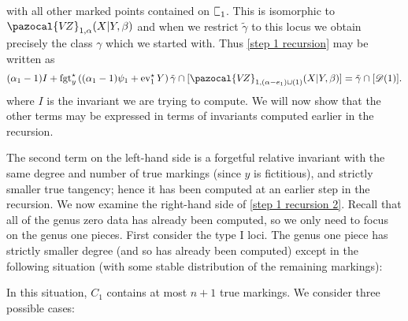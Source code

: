 \documentclass[11pt]{amsart}
\newcommand{\sqC}{\scalebox{0.8}[1.3]{$\sqsubset$}}
\newcommand{\VZ}{\pazocal{V\!Z}}
\newcommand{\st}{\star}
\newcommand{\ev}{\operatorname{ev}}
\newcommand{\fgt}{\operatorname{fgt}}
\newcommand{\Dcal}{\mathcal{D}}
\theoremstyle{definition}
\theoremstyle{definition}
\begin{document}
with all other marked points contained on $\sqC_1$. This is isomorphic to $\VZ_{1,\alpha}(X|Y,\beta)$ and when we restrict $\tilde\gamma$ to this locus we obtain precisely the class $\gamma$ which we started with. Thus \eqref{step 1 recursion} may be written as
\begin{equation} \label{step 1 recursion 2} (\alpha_1-1) I + \fgt_y^\st \left( (\alpha_1-1)\psi_1 + \ev_1^\st Y\right)  \tilde\gamma \cap [\VZ_{1,(\alpha-e_1)\cup(1)}(X|Y,\beta)] = \tilde\gamma \cap [\Dcal(1)]. \end{equation}
where $I$ is the invariant we are trying to compute. We will now show that the other terms may be expressed in terms of invariants computed earlier in the recursion.

The second term on the left-hand side is a forgetful relative invariant with the same degree and number of true markings (since $y$ is fictitious), and strictly smaller true tangency; hence it has been computed at an earlier step in the recursion. We now examine the right-hand side of \eqref{step 1 recursion 2}. Recall that all of the genus zero data has already been computed, so we only need to focus on the genus one pieces. First consider the type I loci. The genus one piece has strictly smaller degree (and so has already been computed) except in the following situation (with some stable distribution of the remaining markings):
\begin{center}
\end{center}
In this situation, $C_1$ contains at most $n+1$ true markings. We consider three possible cases:
\end{document}
